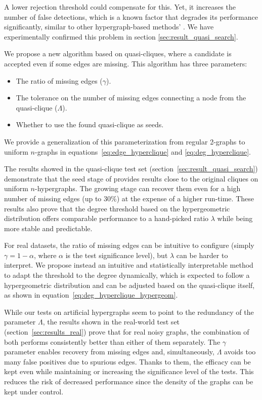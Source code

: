A lower rejection threshold could compensate for this. Yet, it increases the number
of false detections, which is a known factor that degrades
its performance significantly, similar to other hypergraph-based methods' \cite{koeller2006heuristic}.
We have experimentally confirmed this problem in section \ref{sec:result_quasi_search}.

We propose a new algorithm based on quasi-cliques, where a candidate is accepted
even if some edges are missing. This algorithm has three parameters:

\begin{itemize}
    \item The ratio of missing edges ($\gamma$).
    \item The tolerance on the number of missing edges connecting a node from the quasi-clique ($\Lambda$).
    \item Whether to use the found quasi-clique as seeds.
\end{itemize}

We provide a generalization of this parameterization from regular 2-graphs
\cite{brunato2007effectively} to uniform $n$-graphs in equations~\ref{eq:edge_hyperclique}
and \ref{eq:deg_hyperclique}.

The results showed in the quasi-clique test set (section~\ref{sec:result_quasi_search})
demonstrate that the seed stage of \PresQ provides results close to the original
cliques on uniform $n$-hypergraphs. The growing stage
can recover them even for a high number of missing edges (up to $30\%$) at the expense of a higher run-time.
These results also prove that the degree threshold based on the hypergeometric distribution
offers comparable performance to a hand-picked ratio $\lambda$
while being more stable and predictable.

For real datasets, the ratio of missing edges can be intuitive to configure
(simply $\gamma = 1 - \alpha$, where $\alpha$ is the test significance level), 
but $\lambda$ can be harder to interpret. We propose instead an intuitive and statistically
interpretable method to adapt the threshold to the degree dynamically, which is expected
to follow a hypergeometric distribution and can be adjusted based on the quasi-clique
itself, as shown in equation~\ref{eq:deg_hyperclique_hypergeom}.

While our tests on artificial hypergraphs seem to point to the redundancy of the parameter $\Lambda$,
the results shown in the real-world test set (section~\ref{sec:results_real}) prove that for real noisy graphs,
the combination of both performs consistently better than
either of them separately. The $\gamma$ parameter enables recovery from missing edges and,
simultaneously, $\Lambda$ avoids too many false positives due to 
spurious edges. Thanks to them, the efficacy can be kept even while maintaining or 
increasing the significance level of the tests. This reduces the risk of decreased
performance since the density of the graphs can be kept under control.

